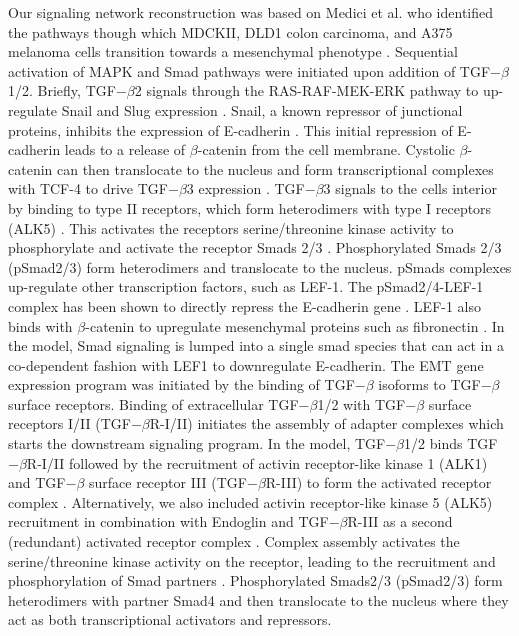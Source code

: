 \documentclass[12pt]{article}
\begin{document}
Our signaling network reconstruction was based on Medici et al. who identified the pathways though which MDCKII, DLD1 colon carcinoma,
and A375 melanoma cells transition towards a mesenchymal phenotype \citep{Medici:2008fk}.
Sequential activation of MAPK and Smad pathways were initiated upon addition of TGF$-\beta$1/2.  Briefly, TGF$-\beta$2 signals through the RAS-RAF-MEK-ERK pathway to up-regulate Snail and Slug expression \citep{Medici:2006qa}.  Snail, a known repressor of junctional proteins, inhibits the expression of E-cadherin \citep{Cano:2000kh}. This initial repression of E-cadherin leads to a release of $\beta$-catenin from the cell membrane. Cystolic $\beta$-catenin can then translocate to the nucleus and form transcriptional complexes with TCF-4 to drive TGF$-\beta$3 expression \citep{Medici:2008fk}. TGF$-\beta$3 signals to the cells interior by binding to type II receptors, which form heterodimers with type I receptors (ALK5) \citep{Derynck:2003fc}. This activates the receptors serine/threonine kinase activity to phosphorylate and activate the receptor Smads 2/3 \citep{Massague:2005qc}.
Phosphorylated Smads 2/3 (pSmad2/3) form heterodimers and translocate to the nucleus. pSmads complexes up-regulate other transcription factors, such as LEF-1. The pSmad2/4-LEF-1 complex has been shown to directly repress the E-cadherin gene \citep{Nawshad:2007kl}. LEF-1 also binds with $\beta$-catenin to upregulate mesenchymal proteins such as fibronectin \citep{Medici2011}.
In the model, Smad signaling is lumped into a single smad species that can act in a co-dependent fashion with LEF1 to downregulate E-cadherin.
The EMT gene expression program was initiated by the binding of TGF$-\beta$ isoforms to TGF$-\beta$ surface receptors.
Binding of extracellular TGF$-\beta$1/2 with TGF$-\beta$ surface receptors I/II (TGF$-\beta$R-I/II) initiates the assembly of adapter complexes which starts the
downstream signaling program. In the model, TGF$-\beta$1/2 binds TGF$-\beta$R-I/II followed by the recruitment of activin receptor-like kinase 1 (ALK1) and
TGF$-\beta$ surface receptor III (TGF$-\beta$R-III) to form the activated receptor complex \citep{Derynck:2003fc}.
Alternatively, we also included activin receptor-like kinase 5 (ALK5) recruitment in combination with Endoglin and TGF$-\beta$R-III
as a second (redundant) activated receptor complex \citep{Gatza:2010if}.
Complex assembly activates the serine/threonine kinase activity on the receptor, leading to the recruitment and phosphorylation of Smad partners \citep{Massague:2005qc}.
Phosphorylated Smads2/3 (pSmad2/3) form heterodimers with partner Smad4 and then translocate to the nucleus where they act as both transcriptional activators and repressors.
\end{document}
